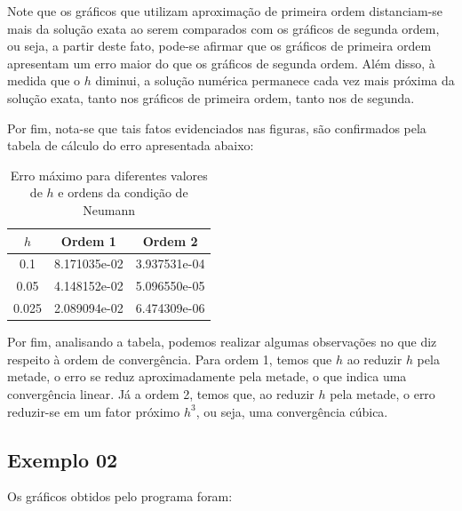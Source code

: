 \documentclass[column,amsmath,amssymb,floatfix]{revtex4}
\begin{document}
Note que os gráficos que utilizam aproximação de primeira ordem distanciam-se mais da solução exata ao serem comparados com os gráficos de segunda ordem, ou seja, a partir deste fato, pode-se afirmar que os gráficos de primeira ordem apresentam um erro maior do que os gráficos de segunda ordem. Além disso, à medida que o $h$ diminui, a solução numérica permanece cada vez mais próxima da solução exata, tanto nos gráficos de primeira ordem, tanto nos de segunda.

Por fim, nota-se que tais fatos evidenciados nas figuras, são confirmados pela tabela de cálculo do erro apresentada abaixo:

\begin{table}[H]
	\centering
	\caption{Erro máximo para diferentes valores de $h$ e ordens da condição de Neumann}
	\label{tab:erro_neumann}
	\renewcommand{\arraystretch}{1.25}
	\setlength{\tabcolsep}{12pt}
	\begin{tabular}{|c|c|c|}
		\hline
		\textbf{$h$} & \textbf{Ordem 1} & \textbf{Ordem 2} \\ \hline
		0.1          & 8.171035e-02     & 3.937531e-04     \\ \hline
		0.05         & 4.148152e-02     & 5.096550e-05     \\ \hline
		0.025        & 2.089094e-02     & 6.474309e-06     \\ \hline  
	\end{tabular}
\end{table}

Por fim, analisando a tabela, podemos realizar algumas observações no que diz respeito à ordem de convergência. Para ordem 1, temos que $h$ ao reduzir $h$ pela metade, o erro se reduz aproximadamente pela metade, o que indica uma convergência linear. Já a ordem 2, temos que, ao reduzir $h$ pela metade, o erro reduzir-se em um fator próximo $h^3$, ou seja, uma convergência cúbica.

\subsection{Exemplo 02}

Os gráficos obtidos pelo programa foram:
\end{document}
